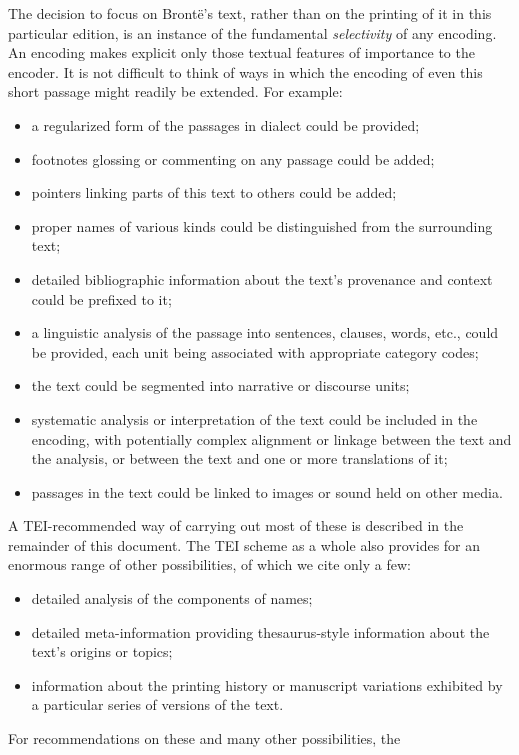 \documentclass[11pt,twoside]{article}\makeatletter
\begin{document}
The decision to focus on Brontë's text, rather than on the
printing of it in this particular edition, is an instance of the
fundamental \textit{selectivity} of any encoding. An encoding makes
explicit only those textual features of importance to the encoder.  It
is not difficult to think of ways in which the encoding of even this
short passage might readily be extended. For example:
\begin{itemize}

\item a regularized form of the passages in dialect could be
provided;
\item footnotes glossing or commenting on any passage could be
added;
\item pointers linking parts of this text to others could be
added;
\item proper names of various kinds could be distinguished from the
surrounding text;
\item detailed bibliographic information about the text's provenance
and context could be prefixed to it;
\item a linguistic analysis of the passage into sentences, clauses,
words, etc., could be provided, each unit being associated with
appropriate category codes;
\item the text could be segmented into narrative or discourse
       units;
\item systematic analysis or interpretation of the text could be
included in the encoding, with potentially complex alignment or
linkage between the text and the analysis, or between the text and one
or more translations of it;
\item passages in the text could be linked to images or sound held on
other media.
\end{itemize} \par A TEI-recommended way of carrying out most of these is described
in the remainder of this document. The TEI scheme as a whole also
provides for an enormous range of other possibilities, of which we
cite only a few:
\begin{itemize}

\item detailed analysis of the components of names;
\item detailed meta-information providing thesaurus-style information
about the text's origins or topics;
\item information about the printing history or manuscript variations
exhibited by a particular series of versions of the text.
\end{itemize}  For recommendations on these and many other possibilities, the
\end{document}
